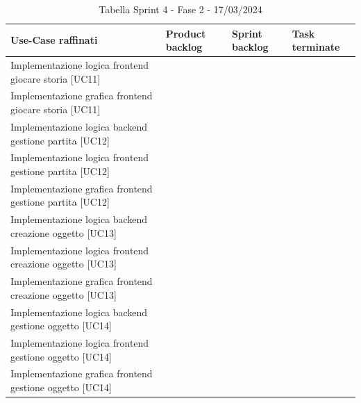 \documentclass{article}
\begin{document}
\begin{table}[h]
    \centering
    \begin{tabularx}{\textwidth}{|X|X|X|X|}
        \hline
        \bf Use-Case raffinati & \bf Product backlog & \bf Sprint backlog & \bf Task terminate \\
        \hline
        Implementazione logica frontend giocare storia [UC11] & & & \\
        \hline
        Implementazione grafica frontend giocare storia [UC11] & & & \\
        \hline
        Implementazione logica backend gestione partita [UC12] & & & \\
        \hline
        Implementazione logica frontend gestione partita [UC12] & & & \\
        \hline
        Implementazione grafica frontend gestione partita [UC12] & & & \\
        \hline
        Implementazione logica backend creazione oggetto [UC13] & & & \\
        \hline
        Implementazione logica frontend creazione oggetto [UC13] & & & \\
        \hline
        Implementazione grafica frontend creazione oggetto [UC13] & & & \\
        \hline
        Implementazione logica backend gestione oggetto [UC14] & & & \\
        \hline
        Implementazione logica frontend gestione oggetto [UC14] & & & \\
        \hline
        Implementazione grafica frontend gestione oggetto [UC14] & & & \\
        \hline
    \end{tabularx}
    \caption*{Tabella Sprint 4 - Fase 2 - 17/03/2024}
\end{table}
\end{document}

